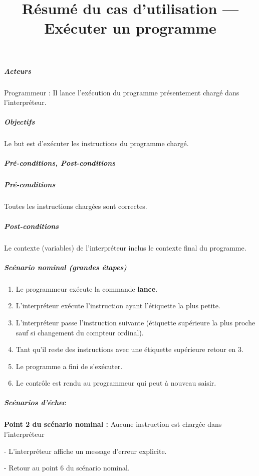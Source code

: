 
\title{Résumé du cas d'utilisation --- Exécuter un programme}
        \subparagraph{Acteurs}
        Programmeur : Il lance l'exécution du programme présentement chargé dans l'interpréteur.

        \subparagraph{Objectifs}
        Le but est d'exécuter les instructions du programme chargé.

        \subparagraph{Pré-conditions, Post-conditions}

            \subparagraph{Pré-conditions}
            Toutes les instructions chargées sont correctes.

            \subparagraph{Post-conditions}
            Le contexte (variables) de l'interpréteur inclus le contexte final du programme.

        \subparagraph{Scénario nominal (grandes étapes)}
            \begin{enumerate}
            	\item Le programmeur exécute la commande \textbf{lance}.
            	\item L'interpréteur exécute l'instruction ayant l'étiquette la plus petite.
            	\item L'interpréteur passe l'instruction suivante (étiquette supérieure la plus proche sauf si changement du compteur ordinal).
            	\item Tant qu'il reste des instructions avec une étiquette supérieure retour en 3.
            	\item Le programme a fini de s'exécuter.
            	\item Le contrôle est rendu au programmeur qui peut à nouveau saisir.
            \end{enumerate}

        \subparagraph{Scénarios d'échec}
            \textbf{Point 2 du scénario nominal :} Aucune instruction est chargée dans l'interpréteur
            \par - L'interpréteur affiche un message d'erreur explicite.
            \par - Retour au point 6 du scénario nominal.
